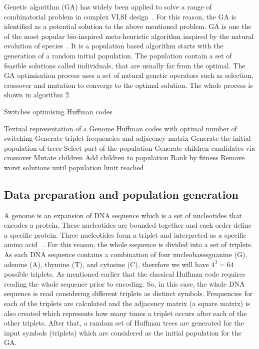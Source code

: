 \documentclass[preprint,12pt]{elsarticle}
\begin{document}
Genetic algorithm (GA) has widely been applied to solve a range of combinatorial problem in complex VLSI design~\cite{chan1991macro,bright1996genetic,cohoon1987genetic}. For this reason, the GA is identified as a potential solution to the above mentioned problem. GA is one the of the most popular bio-inspired meta-heuristic algorithm inspired by the natural evolution of species~\cite{gen1}. It is a population based algorithm starts with the generation of a random initial population. The population contain a set of feasible solutions called individuals, that are usually far from the optimal. The GA optimisation process uses a set of natural genetic operators such as selection, crossover and mutation to converge to the optimal solution. The whole process is shown in algorithm 2.
\begin{algorithm}[!btph]
\caption{Switches optimising Huffman codes}
\label{alg2}
\begin{algorithmic}[1]
\REQUIRE Textual representation of a Genome
\ENSURE Huffman codes with optimal number of switching
\STATE Generate triplet frequencies and adjacency matrix 
\STATE Generate the initial  population of trees
\REPEAT 
\STATE Select part of the population
\STATE Generate children candidates via crossover
\STATE Mutate children
\STATE Add children to population
\STATE Rank by fitness
\STATE Remove worst solutions until population limit reached
\end{algorithmic}
\end{algorithm}
\subsection{ Data preparation and population generation}
A genome is an expansion of DNA sequence which is a set of nucleotides that encodes a protein. These nucleotides are bounded together and each order define a specific protein. Three nucleotides form a triplet and interpreted as a specific amino acid ~\cite{Harvey00}. For this reason, the whole sequence is divided into a set of triplets.  As each DNA sequence contains a combination of four nucleobases\textemdash guanine (G), adenine (A), thymine (T), and cytosine (C), therefore we will have $4^3=64$ possible triplets. As mentioned earlier that the classical Huffman code requires reading the whole sequence prior to encoding. So, in this case, the whole DNA sequence is read considering different triplets as distinct symbols. Frequencies for each of the triplets are calculated and  the adjacency matrix (a square matrix) is also created which represents how many times a triplet occurs after each of the other triplets.  After that, a random set of Huffman trees are generated for the input symbols (triplets) which are considered as the initial population for the GA.
\end{document}
